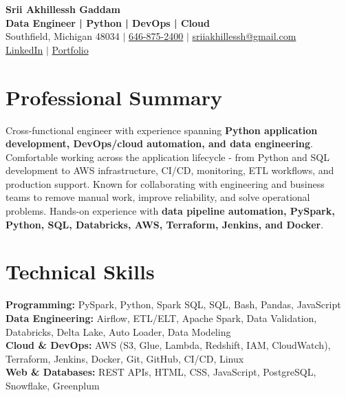 \documentclass[letterpaper,10pt]{article}
\begin{document}
\fontsize{9.35pt}{10.45pt}\selectfont

\begin{center}
    {\LARGE \textbf{Srii Akhillessh Gaddam}} \\[-1pt]
    \textbf{Data Engineer | Python | DevOps | Cloud} \\[2pt]
    Southfield, Michigan 48034 $|$
    \href{tel:6468752400}{646-875-2400} $|$
    \href{mailto:sriiakhillessh@gmail.com}{sriiakhillessh@gmail.com} \\[1pt]
    \href{https://www.linkedin.com/in/srii-akhiilessh-gaddam-b48668191/}{LinkedIn} $|$
    \href{https://sriiakhillesshg.github.io/portfolio/}{Portfolio}
\end{center}
\vspace{-8pt}

\section{Professional Summary}
\small{Cross-functional engineer with experience spanning \textbf{Python application development, DevOps/cloud automation, and data engineering}. Comfortable working across the application lifecycle - from Python and SQL development to AWS infrastructure, CI/CD, monitoring, ETL workflows, and production support. Known for collaborating with engineering and business teams to remove manual work, improve reliability, and solve operational problems. Hands-on experience with \textbf{data pipeline automation, PySpark, Python, SQL, Databricks, AWS, Terraform, Jenkins, and Docker}.}

\section{Technical Skills}
\small{
\textbf{Programming:} PySpark, Python, Spark SQL, SQL, Bash, Pandas, JavaScript \\
\textbf{Data Engineering:} Airflow, ETL/ELT, Apache Spark, Data Validation, Databricks, Delta Lake, Auto Loader, Data Modeling \\
\textbf{Cloud \& DevOps:} AWS (S3, Glue, Lambda, Redshift, IAM, CloudWatch), Terraform, Jenkins, Docker, Git, GitHub, CI/CD, Linux \\
\textbf{Web \& Databases:} REST APIs, HTML, CSS, JavaScript, PostgreSQL, Snowflake, Greenplum
}

\end{document}
